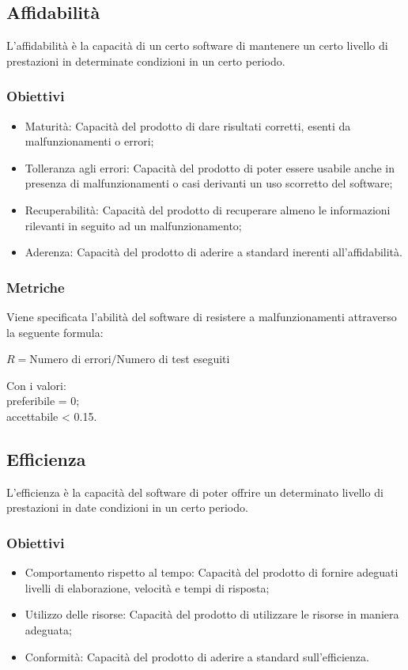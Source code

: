 \subsection{Affidabilità}
L'affidabilità è la capacità di un certo software di mantenere un certo livello di prestazioni in determinate condizioni in un certo periodo.
\subsubsection{Obiettivi}
\begin{itemize}
	\item Maturità: Capacità del prodotto di dare risultati corretti, esenti da malfunzionamenti o errori;
	\item Tolleranza agli errori: Capacità del prodotto di poter essere usabile anche in presenza di malfunzionamenti o casi derivanti un uso scorretto del software;
	\item Recuperabilità: Capacità del prodotto di recuperare almeno le informazioni rilevanti in seguito ad un malfunzionamento;
	\item Aderenza: Capacità del prodotto di aderire a standard inerenti all'affidabilità.
\end{itemize}
\subsubsection{Metriche}
Viene specificata l'abilità del software di resistere a malfunzionamenti attraverso la seguente formula:
\begin{center}
	$R = $Numero di errori$ / $Numero di test eseguiti
\end{center}
Con i valori:\\
preferibile = 0;\\
accettabile < 0.15.

\subsection{Efficienza}
L'efficienza è la capacità del software di poter offrire un determinato livello di prestazioni in date condizioni in un certo periodo.
\subsubsection{Obiettivi}
\begin{itemize}
	\item Comportamento rispetto al tempo: Capacità del prodotto di fornire adeguati livelli di elaborazione, velocità e tempi di risposta;
	\item Utilizzo delle risorse: Capacità del prodotto di utilizzare le risorse in maniera adeguata;
	\item Conformità: Capacità del prodotto di aderire a standard sull'efficienza.
\end{itemize}
